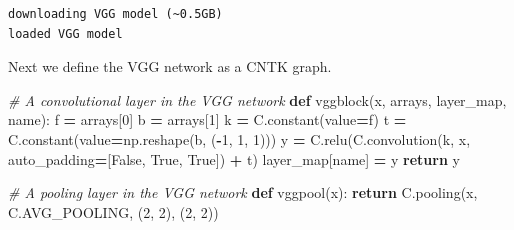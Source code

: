 \documentclass[]{book}
\newenvironment{Shaded}{\begin{snugshade}}{\end{snugshade}}
\newcommand{\KeywordTok}[1]{\textcolor[rgb]{0.13,0.29,0.53}{\textbf{#1}}}
\newcommand{\DecValTok}[1]{\textcolor[rgb]{0.00,0.00,0.81}{#1}}
\newcommand{\CommentTok}[1]{\textcolor[rgb]{0.56,0.35,0.01}{\textit{#1}}}
\newcommand{\VariableTok}[1]{\textcolor[rgb]{0.00,0.00,0.00}{#1}}
\newcommand{\ControlFlowTok}[1]{\textcolor[rgb]{0.13,0.29,0.53}{\textbf{#1}}}
\newcommand{\OperatorTok}[1]{\textcolor[rgb]{0.81,0.36,0.00}{\textbf{#1}}}
\newcommand{\NormalTok}[1]{#1}
\theoremstyle{definition}
\theoremstyle{definition}
\theoremstyle{definition}
\theoremstyle{remark}
\begin{document}
\begin{verbatim}
downloading VGG model (~0.5GB)
loaded VGG model
\end{verbatim}

Next we define the VGG network as a CNTK graph.

\begin{Shaded}
\begin{Highlighting}[]
\CommentTok{# A convolutional layer in the VGG network}
\KeywordTok{def}\NormalTok{ vggblock(x, arrays, layer_map, name):}
\NormalTok{    f }\OperatorTok{=}\NormalTok{ arrays[}\DecValTok{0}\NormalTok{]}
\NormalTok{    b }\OperatorTok{=}\NormalTok{ arrays[}\DecValTok{1}\NormalTok{]}
\NormalTok{    k }\OperatorTok{=}\NormalTok{ C.constant(value}\OperatorTok{=}\NormalTok{f)}
\NormalTok{    t }\OperatorTok{=}\NormalTok{ C.constant(value}\OperatorTok{=}\NormalTok{np.reshape(b, (}\OperatorTok{-}\DecValTok{1}\NormalTok{, }\DecValTok{1}\NormalTok{, }\DecValTok{1}\NormalTok{)))}
\NormalTok{    y }\OperatorTok{=}\NormalTok{ C.relu(C.convolution(k, x, auto_padding}\OperatorTok{=}\NormalTok{[}\VariableTok{False}\NormalTok{, }\VariableTok{True}\NormalTok{, }\VariableTok{True}\NormalTok{]) }\OperatorTok{+}\NormalTok{ t)}
\NormalTok{    layer_map[name] }\OperatorTok{=}\NormalTok{ y}
    \ControlFlowTok{return}\NormalTok{ y}

\CommentTok{# A pooling layer in the VGG network}
\KeywordTok{def}\NormalTok{ vggpool(x):}
    \ControlFlowTok{return}\NormalTok{ C.pooling(x, C.AVG_POOLING, (}\DecValTok{2}\NormalTok{, }\DecValTok{2}\NormalTok{), (}\DecValTok{2}\NormalTok{, }\DecValTok{2}\NormalTok{))}



\end{Highlighting}
\end{Shaded}
\end{document}
